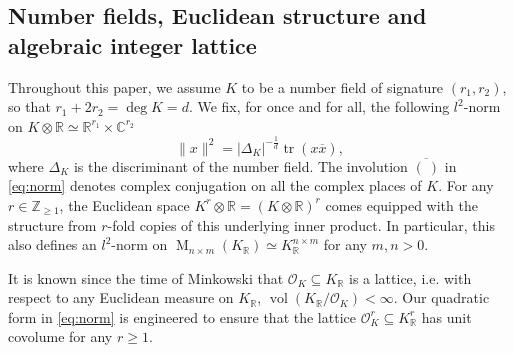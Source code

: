 \documentclass{amsart}
\theoremstyle{definition}
\theoremstyle{remark}
\newcommand{\OK}{\mathcal{O}_K}
\newcommand{\KR}{K_\mathbb{R}}
\DeclareMathOperator{\M}{M}
\DeclareMathOperator{\vol}{vol}
\DeclareMathOperator{\Tr}{tr}
\begin{document}
\subsection{Number fields, Euclidean structure and algebraic integer lattice}
\label{se:haar_on_KR}


Throughout this paper, we assume $K$ to be a number field of signature $(r_1,r_2)$, so that $r_1 + 2 r_2 = \deg K = d$. 
We fix, for once and for all, the following $l^{2}$-norm on $K \otimes \mathbb{R} \simeq \mathbb{R}^{r_1} \times \mathbb{C}^{r_2}$
\begin{equation}
    \|x\|^{2} = |\Delta_K|^{-\frac{1}{d}}  \Tr(x\overline{x}),
    \label{eq:norm}
\end{equation}
where $\Delta_K$ is the discriminant of the number field. The involution $\overline{(\ ) }$ in \eqref{eq:norm}
denotes complex conjugation
on all the complex places of $K$.
For any $r \in \mathbb{Z}_{\geq 1}$, the Euclidean space $K^{r} \otimes \mathbb{R} = (K\otimes \mathbb{R})^{r}$ comes equipped with the structure from $r$-fold copies of this underlying inner product. 
In particular, this also defines an $l^{2}$-norm on $\M_{n \times m}(\KR) \simeq \KR^{n \times m}$ for any $m,n > 0$.

It is known since the time of Minkowski that $\OK \subseteq \KR$ is a lattice, i.e. with respect to any Euclidean measure on $\KR$, $\vol(\KR/\OK) < \infty$.
Our quadratic form in \cref{eq:norm} is engineered to ensure that the lattice $\OK^{r} \subseteq \KR^{r}$ has unit covolume for any $r \geq 1$. 
\end{document}
